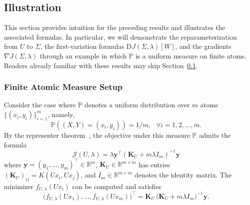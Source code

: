 \documentclass[sn-mathphys-num]{sn-jnl}%
\numberwithin{equation}{section}
\newcommand{\R}{\mathbb{R}}
\newcommand{\kernel}{K}
\renewcommand{\P}{\mathbb{P}}
\theoremstyle{thmstyleone}%
\theoremstyle{thmstyletwo}%
\theoremstyle{thmstylethree}%
\begin{document}
\newcommand{\y}{\mathbf{y}}
\newcommand{\K}{\mathbf{K}}
\subsection{Illustration} 
\label{sec:illustration-under-finite-atomic-measures}
\indent\indent
This section provides intuition for the preceding results and illustrates the associated formulas.
In particular, we will demonstrate the reparameterization from $U$ to $\Sigma$, the first-variation
formulas $\mathrm{D}J(\Sigma,\lambda)[W]$, and the gradients $\nabla J(\Sigma,\lambda)$ through
an example in which $\P$ is a uniform measure on finite atoms.
Readers already familiar with these results may skip Section~\ref{sec:illustration-under-finite-atomic-measures}.



\subsubsection{Finite Atomic Measure Setup}
Consider the case where $\P$ denotes a uniform distribution over $m$ atoms $\{(x_i, y_i)\}_{i=1}^m$, namely, 
\begin{equation*}
	\P((X, Y) = (x_i, y_i)) = 1/m,~~~\forall i = 1, 2, \ldots, m.
\end{equation*}
By the representer theorem~\cite[Proposition 8]{CuckerSm02}, the objective under this measure $\P$ admits the formula
\begin{equation*}
	\mathcal{J}(U, \lambda) = \lambda \y^\top (\K_U+ m\lambda I_m)^{-1} \y
\end{equation*}
where $\y = (y_1,\ldots,y_m)^\top \in \R^m$,
$\K_U \in \R^{m\times m}$ has entries $(\K_U)_{ij} = \kernel(Ux_i, Ux_j)$,
and $I_m \in \R^{m\times m}$ denotes the identity matrix. The minimizer $f_{U, \lambda}(Ux_i)$ 
can be computed
and satisfies 
\begin{equation*}
	\bigl(
		f_{U,\lambda}(Ux_1),
		\ldots,
		f_{U,\lambda}(Ux_m)
	\bigr)^\top
	=
	\K_U\,
	\bigl(\K_U + m\lambda I_m\bigr)^{-1}
	\y .
\end{equation*}
\end{document}
